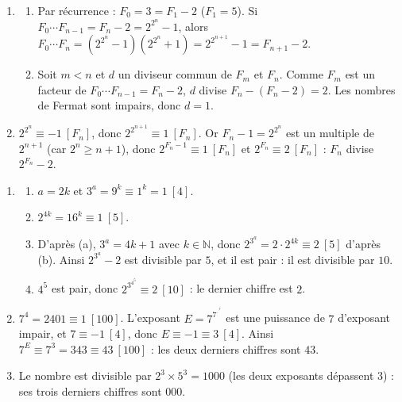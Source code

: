 \begin{corrige}
\begin{sol}
\begin{enumerate}
\end{enumerate}
\end{sol}
%
\begin{sol}
\begin{enumerate}
\item \begin{enumerate}
      \item Par r\'ecurrence : $F_0 = 3 = F_1 - 2$ ($F_1 = 5$). Si $F_0 \cdots F_{n-1} = F_n - 2 = 2^{2^n} - 1$, alors
            $F_0 \cdots F_n = (2^{2^n} - 1)(2^{2^n} + 1) = 2^{2^{n+1}} - 1 = F_{n+1} - 2$.
      \item Soit $m < n$ et $d$ un diviseur commun de $F_m$ et $F_n$. Comme $F_m$ est un facteur de $F_0 \cdots F_{n-1} = F_n - 2$,
            $d$ divise $F_n - (F_n - 2) = 2$. Les nombres de Fermat sont impairs, donc $d = 1$.
      \end{enumerate}
\item $2^{2^n} \equiv -1 \ [F_n]$, donc $2^{2^{n+1}} \equiv 1 \ [F_n]$.
      Or $F_n - 1 = 2^{2^n}$ est un multiple de $2^{n+1}$ (car $2^n \geq n + 1$), donc $2^{F_n - 1} \equiv 1 \ [F_n]$
      et $2^{F_n} \equiv 2 \ [F_n]$ : $F_n$ divise $2^{F_n} - 2$.
\end{enumerate}
\end{sol}
%
\begin{sol}
\begin{enumerate}
\item \begin{enumerate}
      \item $a = 2k$ et $3^a = 9^k \equiv 1^k = 1 \ [4]$.
      \item $2^{4k} = 16^k \equiv 1 \ [5]$.
      \item D'apr\`es (a), $3^a = 4k + 1$ avec $k \in \mathbb{N}$, donc $2^{3^a} = 2 \cdot 2^{4k} \equiv 2 \ [5]$ d'apr\`es (b).
            Ainsi $2^{3^a} - 2$ est divisible par $5$, et il est pair : il est divisible par $10$.
      \item $4^5$ est pair, donc $2^{3^{4^5}} \equiv 2 \ [10]$ : le dernier chiffre est $2$.
      \end{enumerate}
\item $7^4 = 2401 \equiv 1 \ [100]$. L'exposant $E = 7^{7^{\cdot^{\cdot^{7}}}}$ est une puissance de $7$ d'exposant impair, et $7 \equiv -1 \ [4]$,
      donc $E \equiv -1 \equiv 3 \ [4]$. Ainsi $7^E \equiv 7^3 = 343 \equiv 43 \ [100]$ : les deux derniers chiffres sont $43$.
\item Le nombre est divisible par $2^3 \times 5^3 = 1000$ (les deux exposants d\'epassent $3$) : ses trois derniers chiffres sont $000$.

\end{enumerate}
\end{sol}
\end{corrige}
